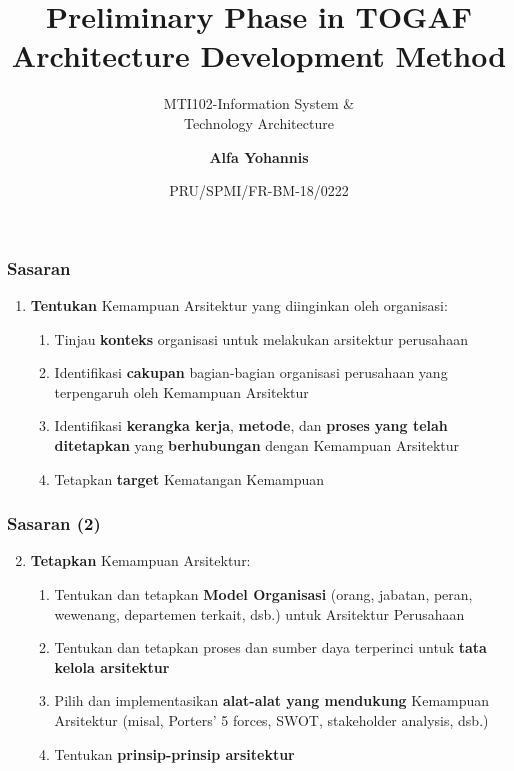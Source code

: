 \documentclass[aspectratio=169, table]{beamer}
\subtitle{MTI102-Information System \&\\Technology Architecture}
\title{Preliminary Phase in TOGAF\\Architecture Development Method}
\date[Serial]{\scriptsize {PRU/SPMI/FR-BM-18/0222}}
\author[Pradita]{\small {\textbf{Alfa Yohannis}}}
\begin{document}
	\frame{\titlepage}



	\begin{frame}
		\frametitle{Sasaran}
		\begin{enumerate}
			\item \textbf{Tentukan} Kemampuan Arsitektur yang diinginkan oleh organisasi:
			\begin{enumerate}
				\item Tinjau \textbf{konteks} organisasi untuk melakukan arsitektur perusahaan
				\item Identifikasi \textbf{cakupan} bagian-bagian organisasi perusahaan yang terpengaruh oleh Kemampuan Arsitektur
				\item Identifikasi \textbf{kerangka kerja}, \textbf{metode}, dan \textbf{proses} \textbf{yang telah ditetapkan} yang \textbf{berhubungan} dengan Kemampuan Arsitektur
				\item Tetapkan \textbf{target} Kematangan Kemampuan
			\end{enumerate}
		\end{enumerate}
	\end{frame}

	\begin{frame}
		\frametitle{Sasaran (2)}
		\begin{enumerate}
			\setcounter{enumi}{1}
			\item \textbf{Tetapkan} Kemampuan Arsitektur:
			\begin{enumerate}
				\item Tentukan dan tetapkan \textbf{Model Organisasi} (orang, jabatan, peran, wewenang, departemen terkait, dsb.) untuk Arsitektur Perusahaan
				\item Tentukan dan tetapkan proses dan sumber daya terperinci untuk \textbf{tata kelola arsitektur}
				\item Pilih dan implementasikan \textbf{alat-alat yang mendukung} Kemampuan Arsitektur (misal, Porters' 5 forces, SWOT, stakeholder analysis, dsb.)
				\item Tentukan \textbf{prinsip-prinsip arsitektur}
			\end{enumerate}
		\end{enumerate}
	\end{frame}
\end{document}
